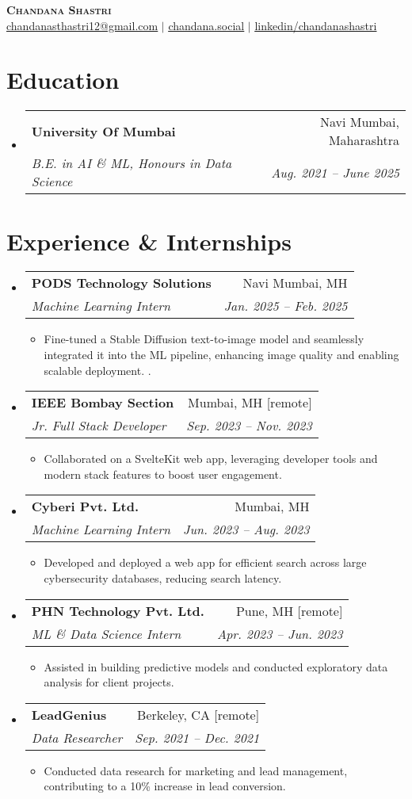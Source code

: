 \documentclass[letterpaper,10pt]{article}
\makeatletter
\newcommand{\resumeItem}[1]{
  \item\small{
    {#1 \vspace{-2pt}}
  }
}
\newcommand{\resumeSubheading}[4]{
  \vspace{-2pt}\item
    \begin{tabular*}{0.97\textwidth}[t]{l@{\extracolsep{\fill}}r}
      \textbf{#1} & #2 \\
      \textit{\small#3} & \textit{\small #4} \\
    \end{tabular*}\vspace{-7pt}
}
\newcommand{\resumeSubHeadingListStart}{\begin{itemize}[leftmargin=0.15in, label={}]}
\newcommand{\resumeSubHeadingListEnd}{\end{itemize}}
\newcommand{\resumeItemListStart}{\begin{itemize}}
\newcommand{\resumeItemListEnd}{\end{itemize}\vspace{-5pt}}
\makeatother
\begin{document}
\begin{center}
    \textbf{\Huge \scshape Chandana Shastri} \\ \vspace{1pt}
    \href{mailto:chandanasthastri12@gmail.com}{\underline{chandanasthastri12@gmail.com}} $|$ 
    \href{https://chandana.social}{\underline{chandana.social}} $|$ 
    \href{https://www.linkedin.com/in/chandana-shastri/}{\underline{linkedin/chandanashastri}}
\end{center}

\section{Education}
  \resumeSubHeadingListStart
    \resumeSubheading
      {University Of Mumbai}{Navi Mumbai, Maharashtra}
      {B.E. in AI \& ML, Honours in Data Science}{Aug. 2021 -- June 2025}
  \resumeSubHeadingListEnd

\section{Experience \& Internships}
  \resumeSubHeadingListStart

    \resumeSubheading
      {PODS Technology Solutions}{Navi Mumbai, MH}
      {Machine Learning Intern}{Jan. 2025 -- Feb. 2025}
      \resumeItemListStart
        \resumeItem{Fine-tuned a Stable Diffusion text-to-image model and seamlessly integrated it into the ML pipeline, enhancing image quality and enabling scalable deployment.
.}
      \resumeItemListEnd
    \resumeSubheading
      {IEEE Bombay Section}{Mumbai, MH [remote]}
      {Jr. Full Stack Developer}{Sep. 2023 -- Nov. 2023}
      \resumeItemListStart
        \resumeItem{Collaborated on a SvelteKit web app, leveraging developer tools and modern stack features to boost user engagement.}
      \resumeItemListEnd
    \resumeSubheading
      {Cyberi Pvt. Ltd.}{Mumbai, MH}
      {Machine Learning Intern}{Jun. 2023 -- Aug. 2023}
      \resumeItemListStart
        \resumeItem{Developed and deployed a web app for efficient search across large cybersecurity databases, reducing search latency.}
      \resumeItemListEnd
    \resumeSubheading
      {PHN Technology Pvt. Ltd.}{Pune, MH [remote]}
      {ML \& Data Science Intern}{Apr. 2023 -- Jun. 2023}
      \resumeItemListStart
        \resumeItem{Assisted in building predictive models and conducted exploratory data analysis for client projects.}
      \resumeItemListEnd
    \resumeSubheading
      {LeadGenius}{Berkeley, CA [remote]}
      {Data Researcher}{Sep. 2021 -- Dec. 2021}
      \resumeItemListStart
        \resumeItem{Conducted data research for marketing and lead management, contributing to a 10\% increase in lead conversion.}
      \resumeItemListEnd
  \resumeSubHeadingListEnd
\end{document}
